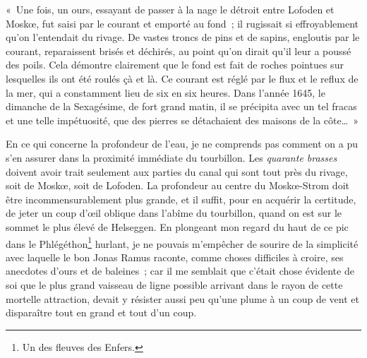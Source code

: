 \documentclass[french,twoside]{book} %
\begin{document}
« Une fois, un ours, essayant de passer à la nage le détroit entre Lofoden et Moskœ, fut saisi par le courant et emporté au fond ; il rugissait si effroyablement qu’on l’entendait du rivage. De vastes troncs de pins et de sapins, engloutis par le courant, reparaissent brisés et déchirés, au point qu’on dirait qu’il leur a poussé des poils. Cela démontre clairement que le fond est fait de roches pointues sur lesquelles ils ont été roulés çà et là. Ce courant est réglé par le flux et le reflux de la mer, qui a constamment lieu de six en six heures. Dans l’année 1645, le dimanche de la Sexagésime, de fort grand matin, il se précipita avec un tel fracas et une telle impétuosité, que des pierres se détachaient des maisons de la côte… »\par
En ce qui concerne la profondeur de l’eau, je ne comprends pas comment on a pu s’en assurer dans la proximité immédiate du tourbillon. Les \emph{quarante brasses} doivent avoir trait seulement aux parties du canal qui sont tout près du rivage, soit de Moskœ, soit de Lofoden. La profondeur au centre du Moskœ-Strom doit être incommensurablement plus grande, et il suffit, pour en acquérir la certitude, de jeter un coup d’œil oblique dans l’abîme du tourbillon, quand on est sur le sommet le plus élevé de Helseggen. En plongeant mon regard du haut de ce pic dans le Phlégéthon\footnote{Un des fleuves des Enfers.} hurlant, je ne pouvais m’empêcher de sourire de la simplicité avec laquelle le bon Jonas Ramus raconte, comme choses difficiles à croire, ses anecdotes d’ours et de baleines ; car il me semblait que c’était chose évidente de soi que le plus grand vaisseau de ligne possible arrivant dans le rayon de cette mortelle attraction, devait y résister aussi peu qu’une plume à un coup de vent et disparaître tout en grand et tout d’un coup.\par
\end{document}
